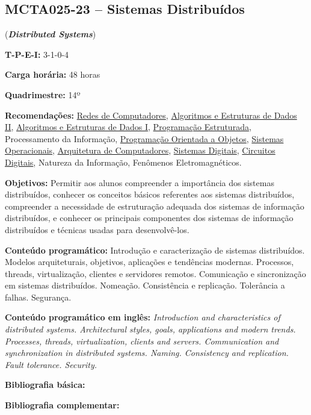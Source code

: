 \documentclass[class=article, crop=false]{standalone}
\begin{document}
\subsection*{MCTA025-23 -- Sistemas Distribuídos}
\label{disc:sist_distr}

(\textbf{\textit{Distributed Systems}})

\begin{center}
\begin{minipage}{0.85\textwidth}
    \textbf{T-P-E-I:} 3-1-0-4
    
    \textbf{Carga horária:} 48 horas
    
    \textbf{Quadrimestre:} 14º
    
    \textbf{Recomendações:} 
    \hyperref[disc:redes]{Redes de Computadores},
    \hyperref[disc:aedII]{Algoritmos e Estruturas de Dados II},
    \hyperref[disc:aedI]{Algoritmos e Estruturas de Dados I},
    \hyperref[disc:pe]{Programação Estruturada},
    Processamento da Informação, 
    \hyperref[disc:poo]{Programação Orientada a Objetos},
    \hyperref[disc:so]{Sistemas Operacionais},
    \hyperref[disc:arq]{Arquitetura de Computadores},
    \hyperref[disc:sist_dig]{Sistemas Digitais},
    \hyperref[disc:circ_dig]{Circuitos Digitais},
    Natureza da Informação,
    Fenômenos Eletromagnéticos.
\end{minipage}
\end{center}

\textbf{Objetivos:}
Permitir aos alunos compreender a importância dos sistemas distribuídos,
conhecer os conceitos básicos referentes aos sistemas distribuídos, compreender
a necessidade de estruturação adequada dos sistemas de informação distribuídos,
e conhecer os principais componentes dos sistemas de informação distribuídos e
técnicas usadas para desenvolvê-los. 

\textbf{Conteúdo programático:}
Introdução e caracterização de sistemas distribuídos. 
Modelos arquiteturais, objetivos, aplicações e tendências modernas. 
Processos, threads, virtualização, clientes e servidores remotos. 
Comunicação e sincronização em sistemas distribuídos. 
Nomeação. 
Consistência e replicação. 
Tolerância a falhas. 
Segurança.

\textbf{Conteúdo programático em inglês:}
\textit{Introduction and characteristics of distributed systems. 
Architectural styles, goals, applications and modern trends. 
Processes, threads, virtualization, clients and servers. 
Communication and synchronization in distributed systems. 
Naming. 
Consistency and replication. 
Fault tolerance. 
Security.}


\newrefsection
\textbf{Bibliografia básica:}
\nocite{2007-tanenbaum, 2005-coulouris, 2007-ghosh}
\printbibliography

\newrefsection
\textbf{Bibliografia complementar:}
\nocite{2009-tanenbaum, 2006-ben, 2008-kshemkalyani, 1997-lynch, 2017-tanenbaum}
\printbibliography
\end{document}
